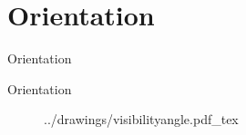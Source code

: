 \section{Orientation}

\begin{frame}{Orientation}{}
\centering
\begin{figure}[!htb]%
\label{fig:prototype2-app-screenshots}
\end{figure}
\end{frame}

\begin{frame}{Orientation}{}
\centering
\begin{figure}[!htb]
    \centering
    \def\svgwidth{0.7\textwidth}
    {../drawings/visibilityangle.pdf_tex}
\label{fig:visibilityangle}
\end{figure}
\end{frame}